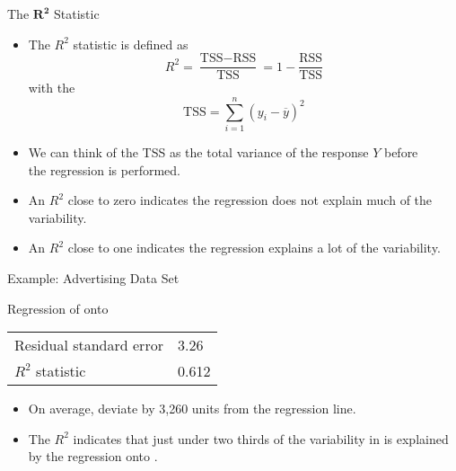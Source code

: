 \documentclass[mathserif, aspectratio=169]{beamer}
\begin{document}
\begin{frame}{The $\bm{R^2}$ Statistic}
	\begin{itemize}
		\item The $R^2$ statistic is defined as
			\[ R^2 = \frac{\text{TSS} - \text{RSS}}{\text{TSS}} = 1 - \frac{\text{RSS}}{\text{TSS}} \]
			with the   
			\[ \text{TSS} = \sum_{i=1}^{n} (y_i - \overline{y})^2 \]
		\item We can think of the TSS as the total variance of the response $Y$ before\\
			the regression is performed.
		\item An $R^2$ close to zero indicates the regression does not explain much of the variability.
		\item An $R^2$ close to one indicates the regression explains a lot of the variability.
	\end{itemize}
\end{frame}

\begin{frame}{Example: Advertising Data Set}
	\begin{popblock}{0.5\textwidth}{Regression of  onto }
		\begin{tabular}[h]{ll}
			Residual standard error & 3.26 \\
			$R^2$ statistic & 0.612 \\
		\end{tabular}
	\end{popblock}
	\begin{itemize}
		\item On average,  deviate by 3,260 units from the regression line.
		\item The $R^2$ indicates that just under two thirds of the variability in  is explained\\
			by the regression onto .
	\end{itemize}
\end{frame}
\end{document}
